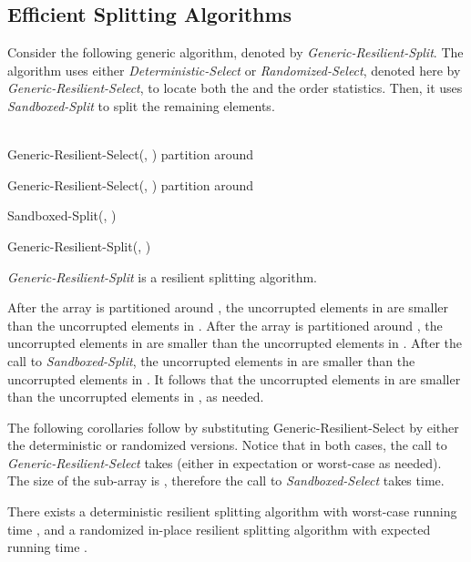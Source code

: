 \documentclass{llncs}
\begin{document}
\subsection{Efficient Splitting Algorithms}
\label{generic_splitting_algorithms}

Consider the following generic algorithm, denoted by \emph{Generic-Resilient-Split}. The algorithm uses either \emph{Deterministic-Select} or \emph{Randomized-Select}, denoted here by \emph{Generic-Resilient-Select}, to locate both the  and the  order statistics. Then, it uses \emph{Sandboxed-Split} to split the remaining  elements.\\ \ \\

\begin{algorithm}[H]

 Generic-Resilient-Select(, )\;
partition  around \;
\If{}{\Return}

 Generic-Resilient-Select(, )\;
partition  around \;
\If{}{\Return}

Sandboxed-Split(, )\;

\caption{Generic-Resilient-Split(, )}
\end{algorithm}
\vspace{0.4cm}

\begin{lemma}
\label{lem:generic_resilient_split_lemma}
\emph{Generic-Resilient-Split} is a resilient splitting algorithm.
\end{lemma}

\begin{pf}
After the array is partitioned around , the uncorrupted elements in  are smaller than the uncorrupted elements in . After the array is partitioned around , the uncorrupted elements in  are smaller than the uncorrupted elements in . After the call to \emph{Sandboxed-Split}, the uncorrupted elements in  are smaller than the uncorrupted elements in . It follows that the uncorrupted elements in  are smaller than the uncorrupted elements in , as needed.~\end{pf}




The following corollaries follow by substituting Generic-Resilient-Select by either the deterministic or randomized versions. Notice that in both cases, the call to \emph{Generic-Resilient-Select} takes  (either in expectation or worst-case as needed). The size of the sub-array  is , therefore the call to \emph{Sandboxed-Select} takes  time.

\begin{corollary}
\label{cor:resilient_split}
There exists a deterministic resilient splitting algorithm with worst-case running time , and a randomized in-place resilient splitting algorithm with expected running time .
\end{corollary}
\end{document}
